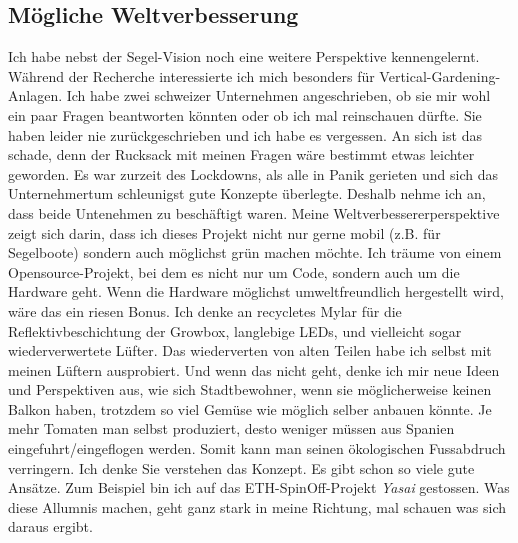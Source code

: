 \documentclass[12pt,titlepage,a4paper]{article}
\begin{document}
\subsection{Mögliche Weltverbesserung}
Ich habe nebst der Segel-Vision noch eine weitere Perspektive kennengelernt. Während der Recherche interessierte ich mich besonders für Vertical-Gardening-Anlagen. Ich habe zwei schweizer Unternehmen angeschrieben, ob sie mir wohl ein paar Fragen beantworten könnten oder ob ich mal reinschauen dürfte. Sie haben leider nie zurückgeschrieben und ich habe es vergessen. An sich ist das schade, denn der Rucksack mit meinen Fragen wäre bestimmt etwas leichter geworden. Es war zurzeit des Lockdowns, als alle in Panik gerieten und sich das Unternehmertum schleunigst gute Konzepte überlegte. Deshalb nehme ich an, dass beide Untenehmen zu beschäftigt waren. Meine Weltverbessererperspektive zeigt sich darin, dass ich dieses Projekt nicht nur gerne mobil (z.B. für Segelboote) sondern auch möglichst grün machen möchte. Ich träume von einem Opensource-Projekt, bei dem es nicht nur um Code, sondern auch um die Hardware geht. Wenn die Hardware möglichst umweltfreundlich hergestellt wird, wäre das ein riesen Bonus. Ich denke an recycletes Mylar für die Reflektivbeschichtung der Growbox, langlebige LEDs, und vielleicht sogar wiederverwertete Lüfter. Das wiederverten von alten Teilen habe ich selbst mit meinen Lüftern ausprobiert. Und wenn das nicht geht, denke ich mir neue Ideen und Perspektiven aus, wie sich Stadtbewohner, wenn sie möglicherweise keinen Balkon haben, trotzdem so viel Gemüse wie möglich selber anbauen könnte. Je mehr Tomaten man selbst produziert, desto weniger müssen aus Spanien eingefuhrt/eingeflogen werden. Somit kann man seinen ökologischen Fussabdruch verringern. Ich denke Sie verstehen das Konzept. Es gibt schon so viele gute Ansätze. Zum Beispiel bin ich auf das ETH-SpinOff-Projekt \textit{Yasai} gestossen. Was diese Allumnis machen, geht ganz stark in meine Richtung, mal schauen was sich daraus ergibt.
\end{document}
